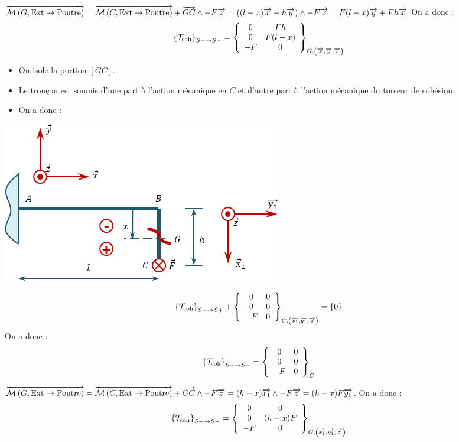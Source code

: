 \documentclass[10pt,fleqn]{article} %
\begin{document}
\begin{multicols}{2}
\begin{corrige}
$\vectm{G}{\text{Ext}}{\text{Poutre}}
=\vectm{C}{\text{Ext}}{\text{Poutre}} + \vect{GC}\wedge -F \vect{z}  
= \left( (l-x) \vect{x} - h\vect{y} \right) \wedge -F \vect{z}
= F(l-x) \vect{y} +F h\vect{x} 
$
On a donc :
$$
\torseurscoh_{S+\rightarrow S-}
=\torseurcol{0}{0}{-F}{Fh}{F(l-x)}{0}{G,\left( \vect{x},\vect{y},\vect{z} \right)}
$$


\begin{minipage}[c]{.45\linewidth}
\begin{itemize}[label=,font=\color{ocre}] 
\item On isole la portion $[GC]$.
\item Le tronçon est soumis d'une part à l'action mécanique en $C$ et d'autre part à l'action mécanique du torseur de cohésion.
\item On a donc :
\end{itemize}
\end{minipage}\hfill
\begin{minipage}[c]{.45\linewidth}
\begin{center}
\includegraphics[width=.8\linewidth]{images/exo_02_corr_02}
\end{center}
\end{minipage}
$$
\torseurscoh_{S-\rightarrow S+} + \torseurcol{0}{0}{-F}{0}{0}{0}{C,\left( \vect{x_1},\vect{y_1},\vect{z} \right)} = \{0\}
$$
On a donc :
$$
\torseurscoh_{S+\rightarrow S-}
=\torseurcol{0}{0}{-F}{0}{0}{0}{C}
$$

$\vectm{G}{\text{Ext}}{\text{Poutre}}
=\vectm{C}{\text{Ext}}{\text{Poutre}} + \vect{GC}\wedge -F \vect{z}  
=  (h-x) \vect{x_1}  \wedge -F \vect{z}
=  (h-x) F \vect{y_1}
$. 
On a donc :
$$
\torseurscoh_{S+\rightarrow S-}
=\torseurcol{0}{0}{-F}{0}{(h-x) F}{0}{G,\left( \vect{x_1},\vect{y_1},\vect{z} \right)}
$$



\end{corrige}
\else 
\fi


\end{multicols}
\end{document}

